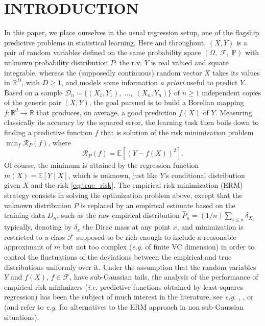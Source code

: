 \section{INTRODUCTION}

In this paper, we place ourselves in the usual regression setup, one of the flagship predictive problems in statistical learning. Here and throughout, $(X,Y)$ is a pair of random variables defined on the same probability space $(\Omega,\; \mathcal{F},\; \mathbb{P})$ with unknown probability distribution $P$: the r.v. $Y$ is real valued and square integrable, whereas the (supposedly continuous) random vector $X$ takes its values in $\mathbb{R}^D$, with $D\geq 1$, and models some information \textit{a priori} useful to predict $Y$. Based on a sample $\mathcal{D}_n=\{ (X_1,Y_1),\; \ldots,\; (X_n,Y_n) \}$ of $n\geq 1$ independent copies of the generic pair $(X,Y)$, the goal pursued is to build a Borelian mapping $f:\mathbb{R}^d\rightarrow \mathbb{R}$ that produces, on average, a good prediction $f(X)$ of $Y$. Measuring classically its accuracy by the squared error, the learning task then boils down to finding a predictive function $f$ that is solution of the risk minimization problem $\min_{f}\mathcal{R}_P(f)$, where 
\begin{equation}\label{eq:true_risk}
\mathcal{R}_P(f)=\mathbb{E}\left[\left(Y-f(X)\right)^2\right].
\end{equation}
Of course, the minimum is attained by the regression function $m(X)=\mathbb{E}[Y\mid X]$, which is unknown, just like $Y$'s conditional distribution given $X$ and the risk \eqref{eq:true_risk}. The empirical risk minimization (ERM) strategy consists in solving the optimization problem above, except that the unknown distribution $P$ is replaced by an empirical estimate based on the training data $\mathcal{}D_n$, such as the raw empirical distribution $\hat{P}_n=(1/n)\sum_{i\leq n}\delta_{X_i}$ typically, denoting by $\delta_x$ the Dirac mass at any point $x$, and minimization is restricted to a class $\mathcal{F}$ supposed to be rich enough to include a reasonable approximant of $m$ but not too complex (\textit{e.g.} of finite {\sc VC} dimension) in order to control the fluctuations of the deviations between the empirical and true distributions uniformly over it. Under the assumption that the random variables $Y$ and $f(X)$, $f\in \mathcal{F}$, have sub-Gaussian tails, the analysis of the performance of empirical risk minimizers (\textit{i.e.} predictive functions obtained by least-squares regression) has been the subject of much interest in the literature, see \textit{e.g.} \cite{gyorfiDistributionFreeTheoryNonparametric2002}, \cite{massartConcentrationInequalitiesModel2007}, \cite{boucheronConcentrationInequalitiesNonasymptotic2013} or \cite{lecueLearningSubgaussianClasses2016} (and refer to \textit{e.g.} \cite{lugosiRiskMinimizationMedianofmeans2016} for alternatives to the ERM approach in non sub-Gaussian situations).

